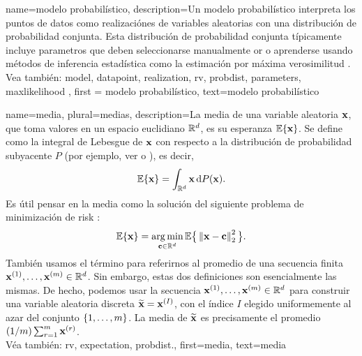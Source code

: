 {
	name=modelo probabilístico,
	description={Un modelo probabilístico interpreta los puntos de datos
		como realizaciónes de variables aleatorias con una distribución de probabilidad conjunta. Esta distribución de probabilidad conjunta típicamente 
		incluye parametros que deben seleccionarse manualmente or o aprenderse usando métodos de inferencia estadística  
		como la estimación por máxima verosimilitud \cite{LC}.
		\\
		Vea también: \gls{model}, \gls{datapoint}, \gls{realization}, \gls{rv}, \gls{probdist}, \gls{parameters}, \gls{maxlikelihood} }, 
	first = {modelo probabilístico}, text={modelo probabilístico} 
}



		{name={media},
			plural={medias},
			description={La media de una variable aleatoria ${\bf x}$, que toma
				valores en un espacio euclidiano $\mathbb{R}^{d}$, es su
				esperanza $\mathbb{E}\{{\bf x}\}$. Se define como la integral de Lebesgue
				de ${\bf x}$ con respecto a la distribución de probabilidad subyacente $P$ (por ejemplo,
				ver \cite{RudinBookPrinciplesMatheAnalysis} o \cite{BillingsleyProbMeasure}), es decir,
				\[
					\mathbb{E}\{{\bf x}\} = \int_{\mathbb{R}^{d}} {\bf x} \, \mathrm{d}P({\bf x}).
				\]
				Es útil pensar en la media como la solución del siguiente problema de minimización de \gls{risk}
				\cite{BertsekasProb}:
				\[
					\mathbb{E}\{{\bf x}\} = \operatorname*{arg\,min}_{{\bf c} \in \mathbb{R}^{d}}
					\mathbb{E} \big\{\left\Vert {{\bf x}- {\bf c}} \right\Vert_{2}^{2}\big \}.
				\]
				También usamos el término para referirnos al promedio de una secuencia finita
				${\bf x}^{(1)}, \ldots, {\bf x}^{(m)} \in \mathbb{R}^{d}$. Sin embargo,
				estas dos definiciones son esencialmente las mismas. De hecho, podemos usar la secuencia
				${\bf x}^{(1)}, \ldots, {\bf x}^{(m)} \in \mathbb{R}^{d}$ para construir una
				variable aleatoria discreta $\widetilde{{\bf x}}={\bf x}^{(I)}$, con el índice $I$ elegido uniformemente
				al azar del conjunto $\{1, \ldots, m\}$. La media de $\widetilde{{\bf x}}$ es
				precisamente el promedio $({1}/{m}) \sum_{r=1}^{m} {\bf x}^{(r)}$.
				\\
				Véa también: \gls{rv}, \gls{expectation}, \gls{probdist}.},
			first={media},
			text={media}
		}

